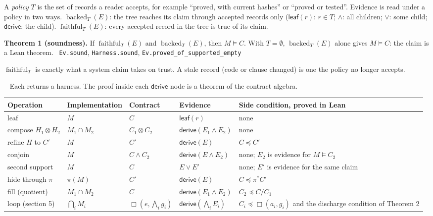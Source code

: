 \documentclass[10pt]{article}
\newcommand{\head}[1]{\par\vspace{2pt}{\color{accent}\bfseries #1}\ }
\newcommand{\thm}[2]{\par\vspace{1pt}\colorbox{soft}{\parbox{\dimexpr\linewidth-2\fboxsep}{\textbf{#1.} #2}}\par}
\newcommand{\bkd}{\operatorname{backed}}
\newcommand{\fth}{\operatorname{faithful}}
\newcommand{\always}{\Box}
\newcommand{\lean}[1]{\texttt{#1}}
\begin{document}
A \emph{policy} $T$ is the set of records a reader accepts, for example ``proved, with current hashes'' or ``proved or tested''. Evidence is read under a policy in two ways. $\bkd_T(E)$: the tree reaches its claim through accepted records only ($\mathsf{leaf}(r)$: $r\in T$; $\wedge$: all children; $\vee$: some child; $\mathsf{derive}$: the child). $\fth_T(E)$: every accepted record in the tree is true of its claim.

\thm{Theorem 1 (soundness)}{If $\fth_T(E)$ and $\bkd_T(E)$, then $M\models C$. With $T=\emptyset$, $\bkd_T(E)$ alone gives $M\models C$: the claim is a Lean theorem. \ \lean{Ev.sound}, \lean{Harness.sound}, \lean{Ev.proved\_of\_supported\_empty}}

$\fth_T$ is exactly what a system claim takes on trust. A stale record (code or clause changed) is one the policy no longer accepts.

\head{3. Operations.} Each returns a harness. The proof inside each $\mathsf{derive}$ node is a theorem of the contract algebra.

{\footnotesize\renewcommand{\arraystretch}{1.05}
\begin{tabularx}{\linewidth}{@{}l l l l L@{}}
\toprule
Operation & Implementation & Contract & Evidence & Side condition, proved in Lean\\
\midrule
leaf & $M$ & $C$ & $\mathsf{leaf}(r)$ & none\\
compose $H_1\otimes H_2$ & $M_1\cap M_2$ & $C_1\otimes C_2$ & $\mathsf{derive}(E_1\wedge E_2)$ & none\\
refine $H$ to $C'$ & $M$ & $C'$ & $\mathsf{derive}(E)$ & $C\preceq C'$\\
conjoin & $M$ & $C\wedge C_2$ & $\mathsf{derive}(E\wedge E_2)$ & none; $E_2$ is evidence for $M\models C_2$\\
second support & $M$ & $C$ & $E\vee E'$ & none; $E'$ is evidence for the same claim\\
hide through $\pi$ & $\pi(M)$ & $C'$ & $\mathsf{derive}(E)$ & $C\preceq\pi^{*}C'$\\
fill (quotient) & $M_1\cap M_2$ & $C$ & $\mathsf{derive}(E_1\wedge E_2)$ & $C_2\preceq C/C_1$\\
loop (section 5) & $\bigcap_i M_i$ & $\always(e,\bigwedge_i g_i)$ & $\mathsf{derive}(\bigwedge_i E_i)$ & $C_i\preceq\always(a_i,g_i)$ and the discharge condition of Theorem 2\\
\bottomrule
\end{tabularx}}
\end{document}
